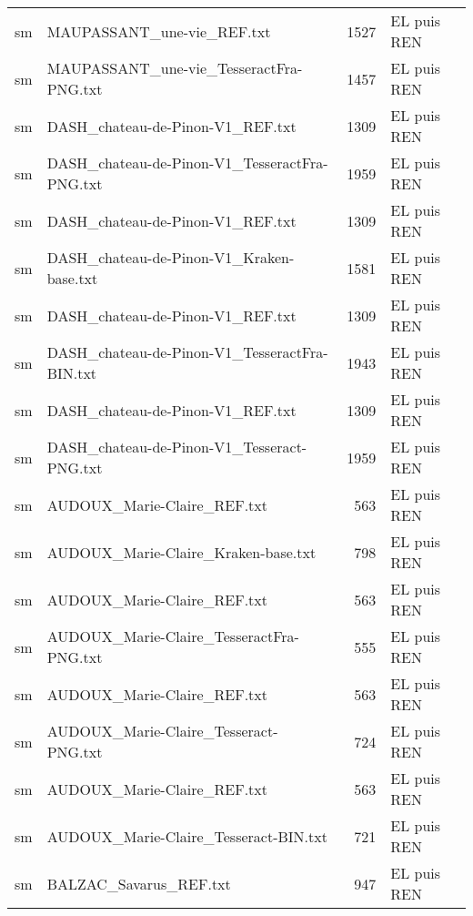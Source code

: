 \begin{tabular}{llrl}
    sm &                         MAUPASSANT\_une-vie\_REF.txt &                  1527 & EL puis REN \\
    sm &            MAUPASSANT\_une-vie\_TesseractFra-PNG.txt &                  1457 & EL puis REN \\
    sm &                   DASH\_chateau-de-Pinon-V1\_REF.txt &                  1309 & EL puis REN \\
    sm &      DASH\_chateau-de-Pinon-V1\_TesseractFra-PNG.txt &                  1959 & EL puis REN \\
    sm &                   DASH\_chateau-de-Pinon-V1\_REF.txt &                  1309 & EL puis REN \\
    sm &           DASH\_chateau-de-Pinon-V1\_Kraken-base.txt &                  1581 & EL puis REN \\
    sm &                   DASH\_chateau-de-Pinon-V1\_REF.txt &                  1309 & EL puis REN \\
    sm &      DASH\_chateau-de-Pinon-V1\_TesseractFra-BIN.txt &                  1943 & EL puis REN \\
    sm &                   DASH\_chateau-de-Pinon-V1\_REF.txt &                  1309 & EL puis REN \\
    sm &         DASH\_chateau-de-Pinon-V1\_Tesseract-PNG.txt &                  1959 & EL puis REN \\
    sm &                        AUDOUX\_Marie-Claire\_REF.txt &                   563 & EL puis REN \\
    sm &                AUDOUX\_Marie-Claire\_Kraken-base.txt &                   798 & EL puis REN \\
    sm &                        AUDOUX\_Marie-Claire\_REF.txt &                   563 & EL puis REN \\
    sm &           AUDOUX\_Marie-Claire\_TesseractFra-PNG.txt &                   555 & EL puis REN \\
    sm &                        AUDOUX\_Marie-Claire\_REF.txt &                   563 & EL puis REN \\
    sm &              AUDOUX\_Marie-Claire\_Tesseract-PNG.txt &                   724 & EL puis REN \\
    sm &                        AUDOUX\_Marie-Claire\_REF.txt &                   563 & EL puis REN \\
    sm &              AUDOUX\_Marie-Claire\_Tesseract-BIN.txt &                   721 & EL puis REN \\
    sm &                             BALZAC\_Savarus\_REF.txt &                   947 & EL puis REN \\

\end{tabular}
